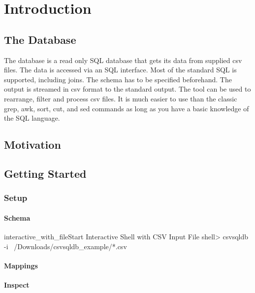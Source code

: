 
\chapter{Introduction}

\section{The \csvsqldb{} Database}

The \csvsqldb{} database is a read only SQL database that gets its data from supplied csv files. The data is accessed via an SQL interface. Most of the standard SQL is supported, including joins. The schema has to be specified beforehand. The output is streamed in csv format to the standard output. The tool can be used to rearrange, filter and process csv files. It is much easier to use than the classic grep, awk, sort, cut, and sed commands as long as you have a basic knowledge of the SQL language.

\section{Motivation}

\section{Getting Started}

\subsection{Setup}

\subsubsection{Schema}

\begin{ShellListing}{interactive_with_file}{Start Interactive Shell with CSV Input File}
shell> csvsqldb -i ~/Downloads/csvsqldb_example/*.csv
\end{ShellListing}

\subsubsection{Mappings}

\subsubsection{Inspect}


